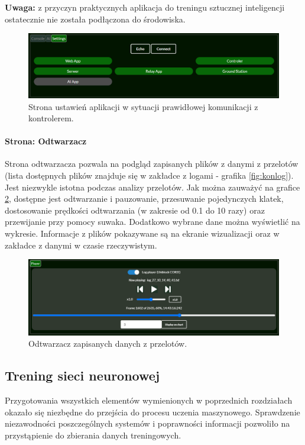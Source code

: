 \documentclass[12pt, a4paper]{article}
\begin{document}
\textbf{Uwaga:} z przyczyn praktycznych aplikacja do treningu sztucznej inteligencji ostatecznie nie została podłączona do środowiska.

 \begin{figure}[H]
    \centering
    \includegraphics[width=1\textwidth]{settings}
    \caption{Strona ustawień aplikacji w sytuacji prawidłowej komunikacji z kontrolerem.}
    \label{fig:settings}
\end{figure}

\paragraph{Strona: Odtwarzacz}\mbox{}

Strona odtwarzacza pozwala na podgląd zapisanych plików z danymi z przelotów (lista dostępnych plików znajduje się w zakładce z logami - grafika \ref{fig:konlog}). Jest niezwykle istotna podczas analizy przelotów. Jak można zauważyć na grafice \ref{fig:player}, dostępne jest odtwarzanie i pauzowanie, przesuwanie pojedynczych klatek, dostosowanie prędkości odtwarzania (w zakresie od 0.1 do 10 razy) oraz przewijanie przy pomocy suwaka. Dodatkowo wybrane dane można wyświetlić na wykresie. Informacje z plików pokazywane są na ekranie wizualizacji oraz w zakładce z danymi w czasie rzeczywistym.

 \begin{figure}[H]
    \centering
    \includegraphics[width=1\textwidth]{player}
    \caption{Odtwarzacz zapisanych danych z przelotów.}
    \label{fig:player}
\end{figure}

\FloatBarrier
\subsection{Trening sieci neuronowej}
Przygotowania wszystkich elementów wymienionych w poprzednich rozdziałach okazało się niezbędne do przejścia do procesu uczenia maszynowego. Sprawdzenie niezawodności poszczególnych systemów i poprawności informacji pozwoliło na przystąpienie do zbierania danych treningowych.
\end{document}
